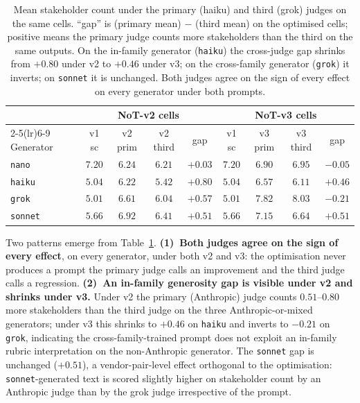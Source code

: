 \documentclass[11pt]{article}
\begin{document}
\begin{table}[t]
\centering\small
\begin{tabular}{lcccccccc}
\toprule
& \multicolumn{4}{c}{\textbf{NoT-v2 cells}} & \multicolumn{4}{c}{\textbf{NoT-v3 cells}} \\
\cmidrule(lr){2-5}\cmidrule(lr){6-9}
Generator & v1 sc & v2 prim & v2 third & gap & v1 sc & v3 prim & v3 third & gap \\
\midrule
\texttt{nano}   & $7.20$ & $6.24$ & $6.21$ & $+0.03$ & $7.20$ & $6.90$ & $6.95$ & $-0.05$ \\
\texttt{haiku}  & $5.04$ & $6.22$ & $5.42$ & $+0.80$ & $5.04$ & $6.57$ & $6.11$ & $+0.46$ \\
\texttt{grok}   & $5.01$ & $6.61$ & $6.04$ & $+0.57$ & $5.01$ & $7.82$ & $8.03$ & $-0.21$ \\
\texttt{sonnet} & $5.66$ & $6.92$ & $6.41$ & $+0.51$ & $5.66$ & $7.15$ & $6.64$ & $+0.51$ \\
\bottomrule
\end{tabular}
\caption{Mean stakeholder count under the primary (haiku) and third
(grok) judges on the same cells. ``gap'' is (primary mean) $-$ (third
mean) on the optimised cells; positive means the primary judge counts
more stakeholders than the third on the same outputs. On the in-family
generator (\texttt{haiku}) the cross-judge gap shrinks from $+0.80$
under v2 to $+0.46$ under v3; on the cross-family generator
(\texttt{grok}) it inverts; on \texttt{sonnet} it is unchanged. Both
judges agree on the sign of every effect on every generator under both
prompts.}
\label{tab:cross_means}
\end{table}

Two patterns emerge from Table~\ref{tab:cross_means}. \textbf{(1)~Both
judges agree on the sign of every effect}, on every generator, under
both v2 and v3: the optimisation never produces a prompt the primary
judge calls an improvement and the third judge calls a regression.
\textbf{(2)~An in-family generosity gap is visible under v2 and shrinks
under v3.} Under v2 the primary (Anthropic) judge counts $0.51$--$0.80$
more stakeholders than the third judge on the three Anthropic-or-mixed
generators; under v3 this shrinks to $+0.46$ on \texttt{haiku} and
inverts to $-0.21$ on \texttt{grok}, indicating the cross-family-trained
prompt does not exploit an in-family rubric interpretation on the
non-Anthropic generator. The \texttt{sonnet} gap is unchanged
($+0.51$), a vendor-pair-level effect orthogonal to the optimisation:
\texttt{sonnet}-generated text is scored slightly higher on stakeholder
count by an Anthropic judge than by the grok judge irrespective of the
prompt.
\end{document}
